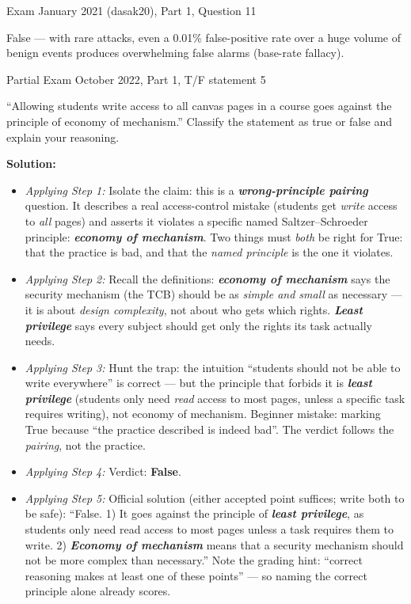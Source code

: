 \documentclass[12pt, a4paper]{article}
\newcommand{\term}[1]{\textbf{\textit{#1}}}        %
\begin{document}
\begin{practicebox}{Exam January 2021 (dasak20), Part 1, Question 11}
\begin{answerbox}
False --- with rare attacks, even a 0.01\% false-positive rate over a huge volume of benign events produces overwhelming false alarms (base-rate fallacy).
\end{answerbox}
\end{practicebox}

\begin{practicebox}{Partial Exam October 2022, Part 1, T/F statement 5}
\begin{problembox}
``Allowing students write access to all canvas pages in a course goes against the principle of economy of mechanism.'' Classify the statement as true or false and explain your reasoning.
\end{problembox}

\textbf{Solution:}
\begin{itemize}
    \item \textit{Applying Step 1:} Isolate the claim: this is a \term{wrong-principle pairing} question. It describes a real access-control mistake (students get \emph{write} access to \emph{all} pages) and asserts it violates a specific named Saltzer--Schroeder principle: \term{economy of mechanism}.
    Two things must \emph{both} be right for True: that the practice is bad, and that the \emph{named principle} is the one it violates.
    \item \textit{Applying Step 2:} Recall the definitions: \term{economy of mechanism} says the security mechanism (the TCB) should be as \emph{simple and small} as necessary --- it is about \emph{design complexity}, not about who gets which rights. \term{Least privilege} says every subject should get only the rights its task actually needs.
    \item \textit{Applying Step 3:} Hunt the trap: the intuition ``students should not be able to write everywhere'' is correct --- but the principle that forbids it is \term{least privilege} (students only need \emph{read} access to most pages, unless a specific task requires writing), not economy of mechanism.
    Beginner mistake: marking True because ``the practice described is indeed bad''. The verdict follows the \emph{pairing}, not the practice.
    \item \textit{Applying Step 4:} Verdict: \textbf{False}.
    \item \textit{Applying Step 5:} Official solution (either accepted point suffices; write both to be safe): ``False. 1) It goes against the principle of \term{least privilege}, as students only need read access to most pages unless a task requires them to write. 2) \term{Economy of mechanism} means that a security mechanism should not be more complex than necessary.'' Note the grading hint: ``correct reasoning makes at least one of these points'' --- so naming the correct principle alone already scores.
\end{itemize}


\end{practicebox}
\end{document}
